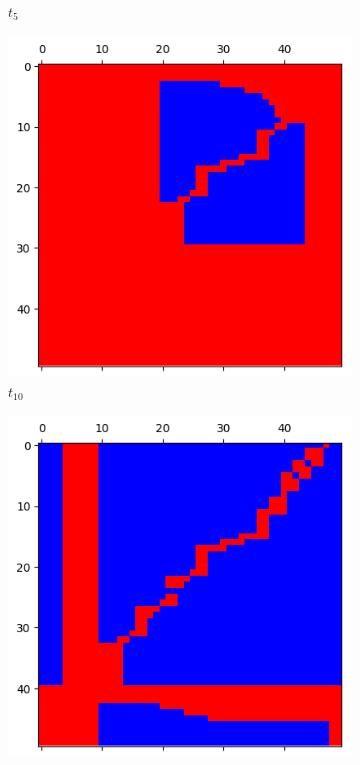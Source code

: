 \documentclass[letterpaper]{article}
\begin{document}
\begin{figure}
\begin{subfigure}{.3\textwidth}
      \caption{$t_5$}
      \label{fig:t5_50part1}
    \end{subfigure}
    \begin{subfigure}{.3\textwidth}
      \centering
      \includegraphics[width=1\linewidth]{images/assign2/visu_50-part1/t10}
      \caption{$t_{10}$}
      \label{fig:t10_50part1}
    \end{subfigure}
    \begin{subfigure}{.3\textwidth}
      \centering
      \includegraphics[width=1\linewidth]{images/assign2/visu_50-part1/t20}

\end{subfigure}
\end{figure}
\end{document}
